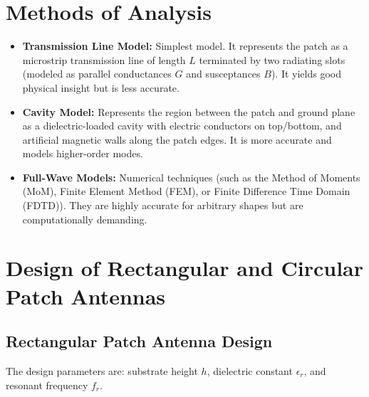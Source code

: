 \documentclass[12pt,a4paper]{article}
\begin{document}
\section{Methods of Analysis}

\begin{itemize}[leftmargin=*, itemsep=3pt]
  \item \textbf{Transmission Line Model:} Simplest model. It represents the patch as a microstrip transmission line of length $L$ terminated by two radiating slots (modeled as parallel conductances $G$ and susceptances $B$). It yields good physical insight but is less accurate.
  \item \textbf{Cavity Model:} Represents the region between the patch and ground plane as a dielectric-loaded cavity with electric conductors on top/bottom, and artificial magnetic walls along the patch edges. It is more accurate and models higher-order modes.
  \item \textbf{Full-Wave Models:} Numerical techniques (such as the Method of Moments (MoM), Finite Element Method (FEM), or Finite Difference Time Domain (FDTD)). They are highly accurate for arbitrary shapes but are computationally demanding.
\end{itemize}

\section{Design of Rectangular and Circular Patch Antennas}

\subsection{Rectangular Patch Antenna Design}
The design parameters are: substrate height $h$, dielectric constant $\epsilon_r$, and resonant frequency $f_r$.
\end{document}
